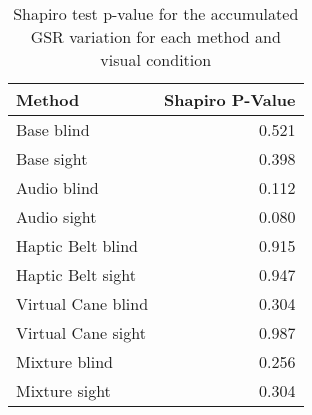 
\begin{table}[!htb]
\centering
\caption{Shapiro test p-value for the accumulated GSR variation for each method and visual condition}
\label{tab:shapiro_gsr_sum}
\begin{tabular}{lr}
\toprule
            Method &  Shapiro P-Value \\
\midrule
        Base blind &            0.521 \\
        Base sight &            0.398 \\
       Audio blind &            0.112 \\
       Audio sight &            0.080 \\
 Haptic Belt blind &            0.915 \\
 Haptic Belt sight &            0.947 \\
Virtual Cane blind &            0.304 \\
Virtual Cane sight &            0.987 \\
     Mixture blind &            0.256 \\
     Mixture sight &            0.304 \\
\bottomrule
\end{tabular}
\end{table}


